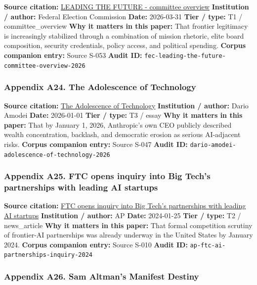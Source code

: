 \documentclass[
  american,
  11pt,
  letterpaper,
]{article}
\begin{document}
\textbf{Source citation:}
\href{https://www.fec.gov/data/committee/C00916114/}{LEADING THE FUTURE
- committee overview} \textbf{Institution / author:} Federal Election
Commission \textbf{Date:} 2026-03-31 \textbf{Tier / type:} T1 /
committee\_overview \textbf{Why it matters in this paper:} That frontier
legitimacy is increasingly stabilized through a combination of mission
rhetoric, elite board composition, security credentials, policy access,
and political spending. \textbf{Corpus companion entry:} Source S-053
\textbf{Audit ID:}
\texttt{fec-leading-the-future-committee-overview-2026}

\subsubsection{Appendix A24. The Adolescence of
Technology}\label{appendix-a24-the-adolescence-of-technology}

\textbf{Source citation:}
\href{https://darioamodei.com/essay/the-adolescence-of-technology}{The
Adolescence of Technology} \textbf{Institution / author:} Dario Amodei
\textbf{Date:} 2026-01-01 \textbf{Tier / type:} T3 / essay \textbf{Why
it matters in this paper:} That by January 1, 2026, Anthropic's own CEO
publicly described wealth concentration, backlash, and democratic
erosion as serious AI-adjacent risks. \textbf{Corpus companion entry:}
Source S-047 \textbf{Audit ID:}
\texttt{dario-amodei-adolescence-of-technology-2026}

\subsubsection{Appendix A25. FTC opens inquiry into Big Tech's
partnerships with leading AI
startups}\label{appendix-a25-ftc-opens-inquiry-into-big-tech-s-partnerships-with-leading-ai-startups}

\textbf{Source citation:}
\href{https://apnews.com/article/67feef411ef311f0be543f546ef34b3d}{FTC
opens inquiry into Big Tech's partnerships with leading AI startups}
\textbf{Institution / author:} AP \textbf{Date:} 2024-01-25 \textbf{Tier
/ type:} T2 / news\_article \textbf{Why it matters in this paper:} That
formal competition scrutiny of frontier-AI partnerships was already
underway in the United States by January 2024. \textbf{Corpus companion
entry:} Source S-010 \textbf{Audit ID:}
\texttt{ap-ftc-ai-partnerships-inquiry-2024}

\subsubsection{Appendix A26. Sam Altman's Manifest
Destiny}\label{appendix-a26-sam-altman-s-manifest-destiny}
\end{document}
